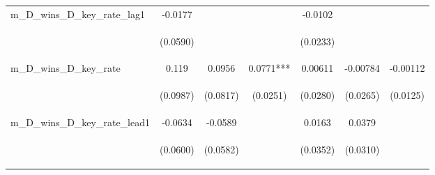 \documentclass[]{article}
\begin{document}
\begin{center}
\begin{tabular}{lcccccc}
m\_D\_wins\_D\_key\_rate\_lag1 & -0.0177 &  &  & -0.0102 &  &  \\
\vspace{4pt} & \begin{footnotesize}(0.0590)\end{footnotesize} & \begin{footnotesize}\end{footnotesize} & \begin{footnotesize}\end{footnotesize} & \begin{footnotesize}(0.0233)\end{footnotesize} & \begin{footnotesize}\end{footnotesize} & \begin{footnotesize}\end{footnotesize} \\
m\_D\_wins\_D\_key\_rate & 0.119 & 0.0956 & 0.0771*** & 0.00611 & -0.00784 & -0.00112 \\
\vspace{4pt} & \begin{footnotesize}(0.0987)\end{footnotesize} & \begin{footnotesize}(0.0817)\end{footnotesize} & \begin{footnotesize}(0.0251)\end{footnotesize} & \begin{footnotesize}(0.0280)\end{footnotesize} & \begin{footnotesize}(0.0265)\end{footnotesize} & \begin{footnotesize}(0.0125)\end{footnotesize} \\
m\_D\_wins\_D\_key\_rate\_lead1 & -0.0634 & -0.0589 &  & 0.0163 & 0.0379 &  \\
\vspace{4pt} & \begin{footnotesize}(0.0600)\end{footnotesize} & \begin{footnotesize}(0.0582)\end{footnotesize} & \begin{footnotesize}\end{footnotesize} & \begin{footnotesize}(0.0352)\end{footnotesize} & \begin{footnotesize}(0.0310)\end{footnotesize} & \begin{footnotesize}\end{footnotesize} \\

\end{tabular}
\end{center}
\end{document}
